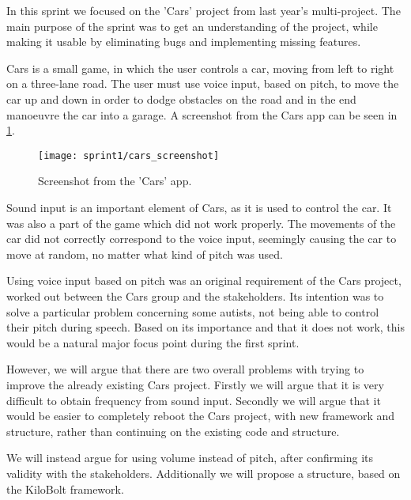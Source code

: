 In this sprint we focused on the 'Cars' project from last year's multi-project.
The main purpose of the sprint was to get an understanding of the project, while making it usable by eliminating bugs and implementing missing features.

Cars is a small game, in which the user controls a car, moving from left to right on a three-lane road.
The user must use voice input, based on pitch, to move the car up and down in order to dodge obstacles on the road and in the end manoeuvre the car into a garage.
A screenshot from the Cars app can be seen in \cref{fig:cars_screenshot}.

\begin{figure}[h]
\centering
\texttt{[image: sprint1/cars\_screenshot]}
\caption{Screenshot from the 'Cars' app.}
\label{fig:cars_screenshot}
\end{figure}

Sound input is an important element of Cars, as it is used to control the car.
It was also a part of the game which did not work properly.
The movements of the car did not correctly correspond to the voice input, seemingly causing the car to move at random, no matter what kind of pitch was used.

Using voice input based on pitch was an original requirement of the Cars project, worked out between the Cars group and the stakeholders.
Its intention was to solve a particular problem concerning some autists, not being able to control their pitch during speech.
Based on its importance and that it does not work, this would be a natural major focus point during the first sprint.

However, we will argue that there are two overall problems with trying to improve the already existing Cars project.
Firstly we will argue that it is very difficult to obtain frequency from sound input.
Secondly we will argue that it would be easier to completely reboot the Cars project, with new framework and structure, rather than continuing on the existing code and structure.

We will instead argue for using volume instead of pitch, after confirming its validity with the stakeholders.
Additionally we will propose a structure, based on the KiloBolt framework.